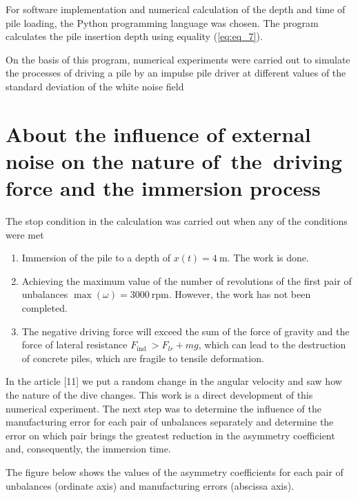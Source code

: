 \documentclass[
11pt,%
tightenlines,%
twoside,%
onecolumn,%
nofloats,%
nobibnotes,%
nofootinbib,%
superscriptaddress,%
noshowpacs,%
centertags]%
{revtex4}
\begin{document}
For software implementation and numerical calculation  of the depth
and time of pile loading, the Python programming language was
chosen. The program calculates the pile insertion depth using
equality (\ref{eq:eq_7}).

On the basis of this program, numerical  experiments were carried
out to simulate the processes of driving a pile by an impulse pile
driver at different values of the standard deviation of the white
noise field

\section{About the influence of external noise on the nature of~the~driving force and the immersion process}
The stop condition in the calculation was carried out  when any of
the conditions were met
\begin{enumerate}
  \item Immersion of the pile to a depth of $x(t)=4 \mathrm{~m}$. The work is done.

  \item Achieving the maximum value of the number of revolutions of
  the first pair of unbalances $\max (\omega)=3000~ \mathrm{rpm}$. However, the work has not been completed.

  \item The negative driving force will exceed the sum of the force
  of gravity and the force of lateral resistance $F_{\text {ind }}>F_{l r}+m g$,
  which can lead to the destruction of concrete piles, which are fragile to tensile deformation.

\end{enumerate}

In the article [11] we put a  random change in the angular velocity
and saw how the nature of the dive changes. This work is a direct
development of this numerical experiment. The next step was to
determine the influence of the manufacturing error for each pair of
unbalances separately and determine the error on which pair brings
the greatest reduction in the asymmetry coefficient and,
consequently, the immersion time.

The figure below shows the values of the asymmetry  coefficients for
each pair of unbalances (ordinate axis) and manufacturing errors
(abscissa axis).
\end{document}
